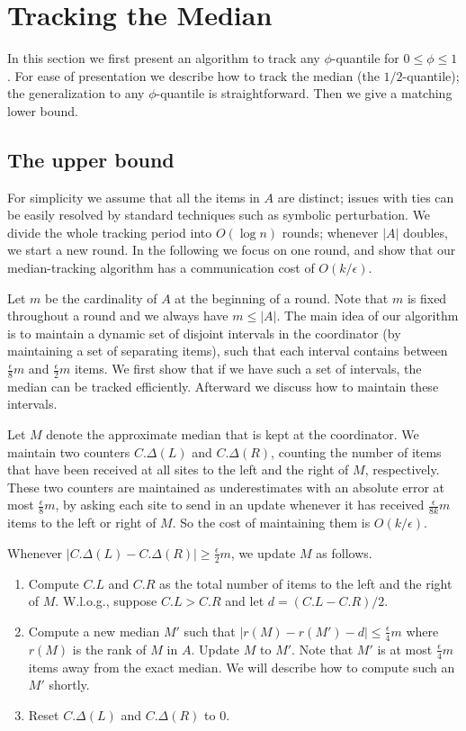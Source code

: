 \documentclass[10pt]{article}
\newcommand{\eps}{\epsilon}
\begin{document}
 
 


\section{Tracking the Median}
\label{sec:track-median}

In this section we first present an algorithm to track any $\phi$-quantile
for $0 \le \phi \le 1$.  For ease of presentation we describe how to track
the median (the $1/2$-quantile); the generalization to any $\phi$-quantile
is straightforward. Then we give a matching lower bound.

\subsection{The upper bound}
For simplicity we assume that all the items in $A$ are distinct; issues
with ties can be easily resolved by standard techniques such as symbolic
perturbation.  We divide the whole tracking period into $O(\log n)$ rounds;
whenever $|A|$ doubles, we start a new round.  In the following we focus on
one round, and show that our median-tracking algorithm has a communication
cost of $O(k/\eps)$.

Let $m$ be the cardinality of $A$ at the beginning of a round.  Note that
$m$ is fixed throughout a round and we always have $m \le |A|$. 
The main
idea of our algorithm is to maintain a 
dynamic set of disjoint intervals in the coordinator (by
maintaining a set of separating items), such that each interval
contains between $\frac{\eps}{8}m$ and $\frac{\eps}{2}m$ items.
We first show that if we have such a set of intervals, the median
can be tracked efficiently.  Afterward we discuss how to maintain
these intervals.

Let $M$ denote the approximate median that is kept at the coordinator.  We
maintain two counters $C.\Delta(L)$ and $C.\Delta(R)$, counting the number
of items that have been received at all sites to the left and the right of
$M$, respectively. These two counters are maintained as underestimates with
an absolute error at most $\frac{\eps}{8} m$, by asking each site to send
in an update whenever it has received $\frac{\eps}{8k}m$ items to the left
or right of $M$.  So the cost of maintaining them is $O(k/\eps)$.

Whenever $|C.\Delta(L) - C.\Delta(R)| \ge \frac{\eps}{2} m$, we
update $M$ as follows.

\begin{enumerate}
\item  Compute $C.L$ and $C.R$ as the total number of items to the left and
  the right of $M$.  W.l.o.g., suppose $C.L > C.R$ and let $d = (C.L -
  C.R)/2$.

\item Compute a new median $M'$ such that $|r(M) - r(M') - d| \le
  \frac{\eps}{4} m$ where $r(M)$ is the rank of $M$ in $A$.  Update $M$ to
  $M'$.  Note that $M'$ is at most $\frac{\eps}{4}m$ items away from the
  exact median.  We will describe how to compute such an $M'$ shortly.

\item Reset $C.\Delta(L)$ and $C.\Delta(R)$ to 0.
\end{enumerate}
\end{document}
